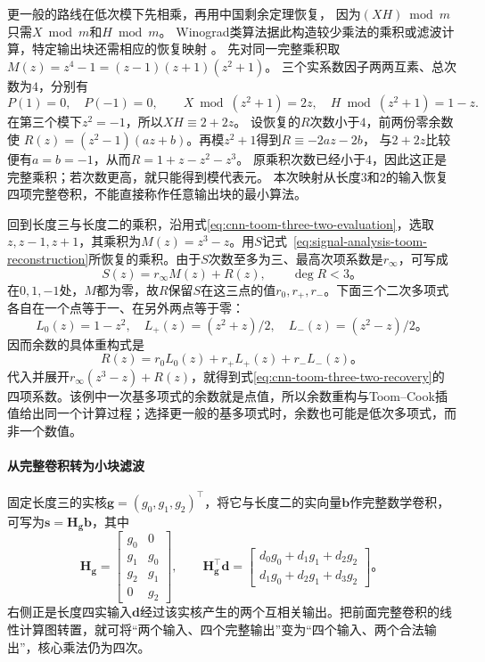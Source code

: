 更一般的路线在低次模下先相乘，再用中国剩余定理恢复，
因为$(XH)\bmod m$只需$X\bmod m$和$H\bmod m$。
Winograd类算法据此构造较少乘法的乘积或滤波计算，特定输出块还需相应的恢复映射
。
先对同一完整乘积取
$M(z)=z^4-1=(z-1)(z+1)(z^2+1)$。
三个实系数因子两两互素、总次数为$4$，分别有
\[
  P(1)=0,\quad P(-1)=0,\qquad
  X\bmod(z^2+1)=2z,\quad H\bmod(z^2+1)=1-z.
\]
在第三个模下$z^2=-1$，所以$XH\equiv2+2z$。
设恢复的$R$次数小于$4$，前两份零余数使
$R(z)=(z^2-1)(az+b)$。再模$z^2+1$得到$R\equiv-2az-2b$，
与$2+2z$比较便有$a=b=-1$，从而$R=1+z-z^2-z^3$。
原乘积次数已经小于$4$，因此这正是完整乘积；若次数更高，就只能得到模代表元。
本次映射从长度$3$和$2$的输入恢复四项完整卷积，不能直接称作任意输出块的最小算法。

回到长度三与长度二的乘积，沿用式\eqref{eq:cnn-toom-three-two-evaluation}，选取$z,z-1,z+1$，其乘积为$M(z)=z^3-z$。用$S$记式~\eqref{eq:signal-analysis-toom-reconstruction}所恢复的乘积。由于$S$次数至多为三、最高次项系数是$r_\infty$，可写成
\begin{equation}
  S(z)=r_\infty M(z)+R(z),\qquad \deg R<3\text{。}
  \label{eq:cnn-winograd-polynomial-remainder}
\end{equation}
在$0,1,-1$处，$M$都为零，故$R$保留$S$在这三点的值$r_0,r_+,r_-$。下面三个二次多项式各自在一个点等于一、在另外两点等于零：
\[
  L_0(z)=1-z^2,\quad
  L_+(z)=(z^2+z)/2,\quad
  L_-(z)=(z^2-z)/2\text{。}
\]
因而余数的具体重构式是
\begin{equation}
  R(z)=r_0L_0(z)+r_+L_+(z)+r_-L_-(z)\text{。}
  \label{eq:cnn-winograd-remainder-reconstruction}
\end{equation}
代入并展开$r_\infty(z^3-z)+R(z)$，就得到式\eqref{eq:cnn-toom-three-two-recovery}的四项系数。该例中一次基多项式的余数就是点值，所以余数重构与Toom--Cook插值给出同一个计算过程；选择更一般的基多项式时，余数也可能是低次多项式，而非一个数值。

\paragraph{从完整卷积转为小块滤波}

固定长度三的实核$\bm g=(g_0,g_1,g_2)^\top$，将它与长度二的实向量$\bm b$作完整数学卷积，可写为$\bm s=\bm H_{\bm g}\bm b$，其中
\begin{equation}
  \bm H_{\bm g}=\begin{bmatrix}
    g_0&0\\g_1&g_0\\g_2&g_1\\0&g_2
  \end{bmatrix},\qquad
  \bm H_{\bm g}^\top\bm d=
  \begin{bmatrix}
    d_0g_0+d_1g_1+d_2g_2\\
    d_1g_0+d_2g_1+d_3g_2
  \end{bmatrix}\text{。}
  \label{eq:cnn-winograd-filter-transposition}
\end{equation}
右侧正是长度四实输入$\bm d$经过该实核产生的两个互相关输出。把前面完整卷积的线性计算图转置，就可将“两个输入、四个完整输出”变为“四个输入、两个合法输出”，核心乘法仍为四次。

